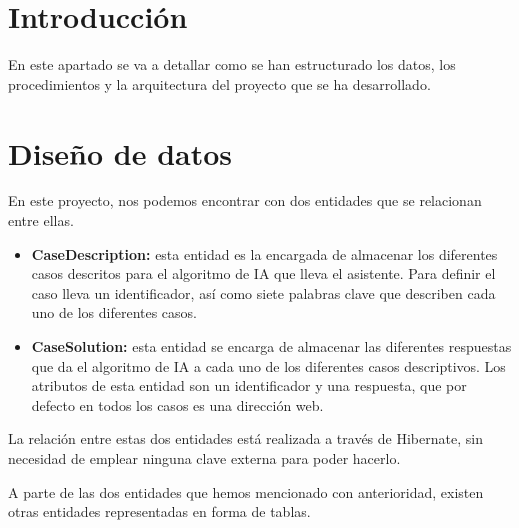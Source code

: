 
\section{Introducción}

En este apartado se va a detallar como se han estructurado los datos, los procedimientos y la arquitectura del proyecto que se ha desarrollado.

\section{Diseño de datos}

En este proyecto, nos podemos encontrar con dos entidades que se relacionan entre ellas.

\begin{itemize}
	\tightlist
	\item
	\textbf{CaseDescription:} esta entidad es la encargada de almacenar los diferentes casos descritos para el algoritmo de IA que lleva el asistente. Para definir el caso lleva un identificador, así como siete palabras clave que describen cada uno de los diferentes casos.
	\item
	\textbf{CaseSolution:} esta entidad se encarga de almacenar las diferentes respuestas que da el algoritmo de IA a cada uno de los diferentes casos descriptivos. Los atributos de esta entidad son un identificador y una respuesta, que por defecto en todos los casos es una dirección web.
\end{itemize}

La relación entre estas dos entidades está realizada a través de Hibernate, sin necesidad de emplear ninguna clave externa para poder hacerlo.


A parte de las dos entidades que hemos mencionado con anterioridad, existen otras entidades representadas en forma de tablas.

